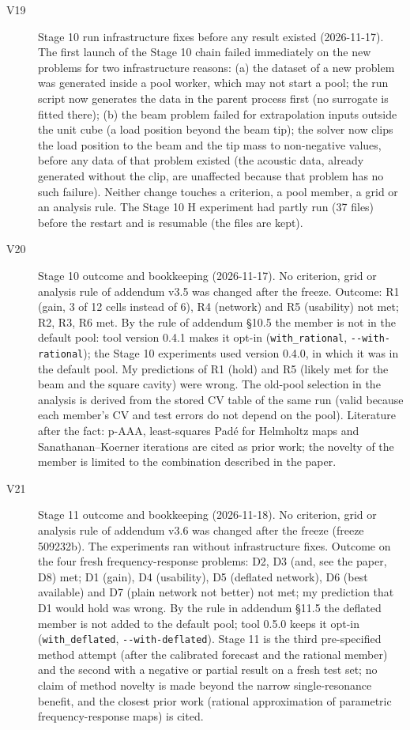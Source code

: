 \begin{description}
\item[V19] Stage 10 run infrastructure fixes before any result existed (2026-11-17). The first launch of the Stage 10 chain failed immediately on the new problems for two infrastructure reasons: (a) the dataset of a new problem was generated inside a pool worker, which may not start a pool; the run script now generates the data in the parent process first (no surrogate is fitted there); (b) the beam problem failed for extrapolation inputs outside the unit cube (a load position beyond the beam tip); the solver now clips the load position to the beam and the tip mass to non-negative values, before any data of that problem existed (the acoustic data, already generated without the clip, are unaffected because that problem has no such failure). Neither change touches a criterion, a pool member, a grid or an analysis rule. The Stage 10 H experiment had partly run (37 files) before the restart and is resumable (the files are kept).
\item[V20] Stage 10 outcome and bookkeeping (2026-11-17). No criterion, grid or analysis rule of addendum v3.5 was changed after the freeze. Outcome: R1 (gain, 3 of 12 cells instead of 6), R4 (network) and R5 (usability) not met; R2, R3, R6 met. By the rule of addendum §10.5 the member is not in the default pool: tool version 0.4.1 makes it opt-in (\texttt{with\_\allowbreak{}rational}, \texttt{-\/\allowbreak{}-with-rational}); the Stage 10 experiments used version 0.4.0, in which it was in the default pool. My predictions of R1 (hold) and R5 (likely met for the beam and the square cavity) were wrong. The old-pool selection in the analysis is derived from the stored CV table of the same run (valid because each member's CV and test errors do not depend on the pool). Literature after the fact: p-AAA, least-squares Padé for Helmholtz maps and Sanathanan--Koerner iterations are cited as prior work; the novelty of the member is limited to the combination described in the paper.
\item[V21] Stage 11 outcome and bookkeeping (2026-11-18). No criterion, grid or analysis rule of addendum v3.6 was changed after the freeze (freeze 509232b). The experiments ran without infrastructure fixes. Outcome on the four fresh frequency-response problems: D2, D3 (and, see the paper, D8) met; D1 (gain), D4 (usability), D5 (deflated network), D6 (best available) and D7 (plain network not better) not met; my prediction that D1 would hold was wrong. By the rule in addendum §11.5 the deflated member is not added to the default pool; tool 0.5.0 keeps it opt-in (\texttt{with\_\allowbreak{}deflated}, \texttt{-\/\allowbreak{}-with-deflated}). Stage 11 is the third pre-specified method attempt (after the calibrated forecast and the rational member) and the second with a negative or partial result on a fresh test set; no claim of method novelty is made beyond the narrow single-resonance benefit, and the closest prior work (rational approximation of parametric frequency-response maps) is cited.
\end{description}
